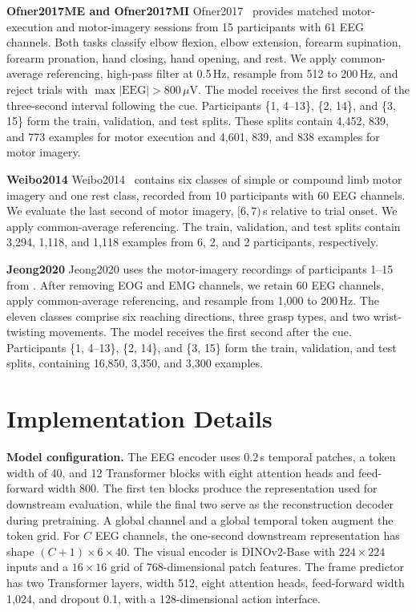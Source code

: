 \noindent\textbf{Ofner2017ME and Ofner2017MI}
Ofner2017~\citep{ofner2017upper} provides matched motor-execution and motor-imagery sessions from 15 participants with 61 EEG channels. Both tasks classify elbow flexion, elbow extension, forearm supination, forearm pronation, hand closing, hand opening, and rest. We apply common-average referencing, high-pass filter at 0.5\,Hz, resample from 512 to 200\,Hz, and reject trials with $\max |\mathrm{EEG}|>800\,\mu$V. The model receives the first second of the three-second interval following the cue. Participants \{1, 4--13\}, \{2, 14\}, and \{3, 15\} form the train, validation, and test splits. These splits contain 4,452, 839, and 773 examples for motor execution and 4,601, 839, and 838 examples for motor imagery.

\noindent\textbf{Weibo2014}
Weibo2014~\citep{yi2014evaluation} contains six classes of simple or compound limb motor imagery and one rest class, recorded from 10 participants with 60 EEG channels. We evaluate the last second of motor imagery, $[6,7)$\,s relative to trial onset. We apply common-average referencing. The train, validation, and test splits contain 3,294, 1,118, and 1,118 examples from 6, 2, and 2 participants, respectively.

\noindent\textbf{Jeong2020}
Jeong2020 uses the motor-imagery recordings of participants 1--15 from \citet{jeong2020multimodal}. After removing EOG and EMG channels, we retain 60 EEG channels, apply common-average referencing, and resample from 1,000 to 200\,Hz. The eleven classes comprise six reaching directions, three grasp types, and two wrist-twisting movements. The model receives the first second after the cue. Participants \{1, 4--13\}, \{2, 14\}, and \{3, 15\} form the train, validation, and test splits, containing 16,850, 3,350, and 3,300 examples.

\section{Implementation Details}
\label{app:mwm-implementation-details}

\noindent\textbf{Model configuration.}
The EEG encoder uses $0.2$\,s temporal patches, a token width of 40, and 12 Transformer blocks with eight attention heads and feed-forward width 800. The first ten blocks produce the representation used for downstream evaluation, while the final two serve as the reconstruction decoder during pretraining. A global channel and a global temporal token augment the token grid. For $C$ EEG channels, the one-second downstream representation has shape $(C+1)\times6\times40$. The visual encoder is DINOv2-Base with $224\times224$ inputs and a $16\times16$ grid of 768-dimensional patch features. The frame predictor has two Transformer layers, width 512, eight attention heads, feed-forward width 1,024, and dropout 0.1, with a 128-dimensional action interface.

